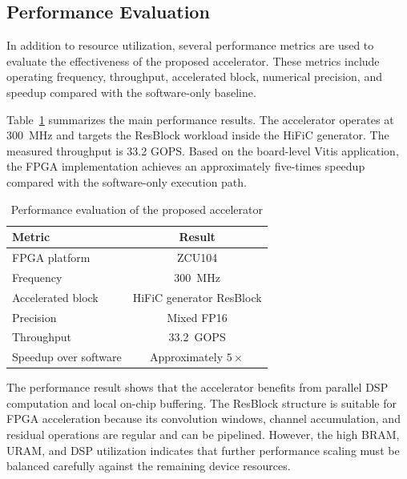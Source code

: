\subsection{Performance Evaluation}

In addition to resource utilization, several performance metrics are used to evaluate the effectiveness of the proposed accelerator. These metrics include operating frequency, throughput, accelerated block, numerical precision, and speedup compared with the software-only baseline.

Table~\ref{tab:performance_evaluation} summarizes the main performance results. The accelerator operates at 300~MHz and targets the ResBlock workload inside the HiFiC generator. The measured throughput is 33.2 GOPS. Based on the board-level Vitis application, the FPGA implementation achieves an approximately five-times speedup compared with the software-only execution path.

\begin{table}[H]
    \centering
    \caption{Performance evaluation of the proposed accelerator}
    \label{tab:performance_evaluation}
    \begin{tabular}{|l|c|}
        \hline
        \textbf{Metric} & \textbf{Result} \\
        \hline
        FPGA platform & ZCU104 \\
        \hline
        Frequency & 300~MHz \\
        \hline
        Accelerated block & HiFiC generator ResBlock \\
        \hline
        Precision & Mixed FP16 \\
        \hline
        Throughput & 33.2~GOPS \\
        \hline
        Speedup over software & Approximately $5\times$ \\
        \hline
    \end{tabular}
\end{table}

The performance result shows that the accelerator benefits from parallel DSP computation and local on-chip buffering. The ResBlock structure is suitable for FPGA acceleration because its convolution windows, channel accumulation, and residual operations are regular and can be pipelined. However, the high BRAM, URAM, and DSP utilization indicates that further performance scaling must be balanced carefully against the remaining device resources.

